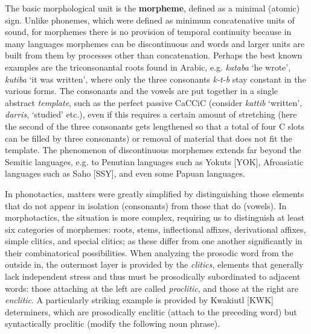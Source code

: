 The basic morphological unit is the {\bf morpheme},  defined
as a minimal (ato\-mic) sign. Unlike phonemes, which were defined as minimum
concatenative units of sound, for morphemes there is no provision of temporal
continuity because in many languages morphemes can be discontinuous and
words and larger units are built from them by processes other than
concatenation. Perhaps the best known examples are the triconsonantal roots
found in Arabic, e.g. {\it kataba} `he wrote', {\it kutiba} `it was written',
where only the three consonants {\it k-t-b} stay constant in the various
forms.  The consonants and the vowels are put together in a single abstract
{\it template}, such as the perfect passive CaCCiC (consider
{\it kattib} `written', {\it darris}, `studied' etc.), even if this requires a
certain amount of stretching (here the second of the three consonants gets
lengthened so that a total of four C slots can be filled by three
consonants) or removal of material that does not fit the template.  The
phenomenon of discontinuous morphemes extends far beyond the Semitic
languages, e.g. to Penutian languages such as Yokuts [YOK], Afroasiatic
languages such as Saho [SSY], and even some Papuan languages.  
 

In phonotactics, matters were greatly simplified by distinguishing those
elements that do not appear in isolation (consonants) from those that do
(vowels). In morphotactics, the situation is more complex, requiring us to
distinguish at least six categories of morphemes: roots, stems, inflectional
affixes, derivational affixes, simple clitics, and special clitics; as these
differ from one another significantly in their combinatorical possibilities.
When analyzing the prosodic word from the outside in, the outermost layer is
provided by the {\it clitics}, elements that generally lack independent stress
and thus must be prosodically subordinated to adjacent words: those attaching
at the left are called {\it proclitic}, and those at the right are {\it
  enclitic}.     A particularly
striking example is provided by Kwakiutl [KWK] 
determiners, which are prosodically enclitic (attach to the preceding word)
but syntactically proclitic (modify the following noun phrase).

